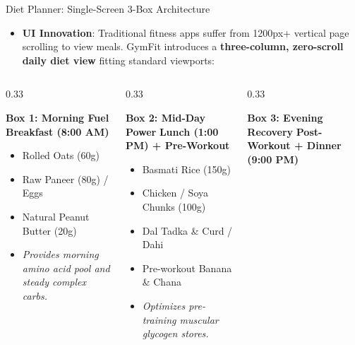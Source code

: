 \documentclass[aspectratio=169,10pt]{beamer}
\begin{document}
\begin{frame}{Diet Planner: Single-Screen 3-Box Architecture}
  \begin{itemize}
    \item \textbf{UI Innovation}: Traditional fitness apps suffer from 1200px+ vertical page scrolling to view meals. GymFit introduces a \textbf{three-column, zero-scroll daily diet view} fitting standard viewports:
  \end{itemize}
  \begin{columns}[T]
    \begin{column}{0.33\textwidth}
      \begin{block}{\textbf{Box 1: Morning Fuel}}
        \textbf{Breakfast (8:00 AM)}
        \begin{itemize}
          \item Rolled Oats (60g)
          \item Raw Paneer (80g) / Eggs
          \item Natural Peanut Butter (20g)
          \item \textit{Provides morning amino acid pool and steady complex carbs.}
        \end{itemize}
      \end{block}
    \end{column}
    \begin{column}{0.33\textwidth}
      \begin{block}{\textbf{Box 2: Mid-Day Power}}
        \textbf{Lunch (1:00 PM) + Pre-Workout}
        \begin{itemize}
          \item Basmati Rice (150g)
          \item Chicken / Soya Chunks (100g)
          \item Dal Tadka \& Curd / Dahi
          \item Pre-workout Banana \& Chana
          \item \textit{Optimizes pre-training muscular glycogen stores.}
        \end{itemize}
      \end{block}
    \end{column}
    \begin{column}{0.33\textwidth}
      \begin{block}{\textbf{Box 3: Evening Recovery}}
        \textbf{Post-Workout + Dinner (9:00 PM)}

\end{block}
\end{column}
\end{columns}
\end{frame}
\end{document}
